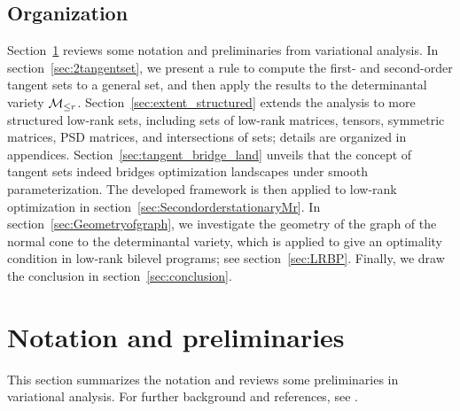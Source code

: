 \subsection{Organization}
Section~\ref{sec:prelimi} reviews some notation and preliminaries from variational analysis. In section~\ref{sec:2tangentset}, we present a rule to compute the first- and second-order tangent sets to a general set, and then apply the results to the determinantal variety $\mathcal{M}_{\le r}$. Section~\ref{sec:extent_structured} extends the analysis to more structured low-rank sets, including sets of low-rank matrices, tensors, symmetric matrices, PSD matrices, and intersections of sets; details are organized in appendices. Section~\ref{sec:tangent_bridge_land} unveils that the concept of tangent sets indeed bridges optimization landscapes under smooth parameterization. The developed framework is then applied to low-rank optimization in section~\ref{sec:SecondorderstationaryMr}. In section~\ref{sec:Geometryofgraph}, we investigate the geometry of the graph of the normal cone to the determinantal variety, which is applied to give an optimality condition in low-rank bilevel programs; see section~\ref{sec:LRBP}. Finally, we draw the conclusion in section~\ref{sec:conclusion}.


\section{Notation and preliminaries}\label{sec:prelimi}
This section summarizes the notation and reviews some preliminaries in variational analysis. For further background and references, see \cite{bonnans2000perturbationanalysis,rockafellar2009variationalanalysis}.

